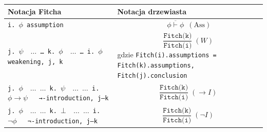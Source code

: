 \documentclass[shortabstract]{iithesis}
\theoremstyle{definition}
\theoremstyle{remark}
\theoremstyle{plain}
\begin{document}
\begin{center}
\small
\begin{longtable}{|p{}|p{}|}
\hline
\textbf{Notacja Fitcha} & \textbf{Notacja drzewiasta} \\
\hline

\texttt{i. $\phi$    assumption}
&
$$\displaystyle
\overline{\ \texttt{$\phi\vdash\phi$}\ }\;(\mathrm{Ass})
$$
\\
\hline
\texttt{j. $\psi \quad \dots$
     \newline
     \dots
     \newline
     k. $\phi \quad \dots$
     \newline
     \dots
     \newline
     i. $\phi$ \quad   weakening, j, k} %
&
$$\displaystyle
\frac{\texttt{Fitch(k)}}{\texttt{Fitch(i)}}\;(W)
$$
gdzie 
\texttt{Fitch(i).assumptions = \newline Fitch(k).assumptions, \newline Fitch(j).conclusion } 

\\
\hline
\texttt{j. $\phi \quad  \dots$
     \newline
     $\dots$
     \newline
     k. $\psi \quad \dots$ 
     \newline
     $\dots$
     \newline
     i. $\phi \to \psi \quad$ →-introduction, j–k
     }





&
$$\displaystyle
\frac{\texttt{Fitch(k)}}{\texttt{Fitch(i)}}\;(\to I)
$$
\\
\hline

\texttt{j. $\phi \quad  \dots$
     \newline
     $\dots$
     \newline
     k. $\bot \quad \dots$ 
     \newline
     $\dots$
     \newline
     i. $\neg \phi \quad$ ¬-introduction, j–k
     }





&
$$\displaystyle
\frac{\texttt{Fitch(k)}}{\texttt{Fitch(i)}}\;(\neg I)
$$
\\










\end{longtable}
\end{center}
\end{document}
